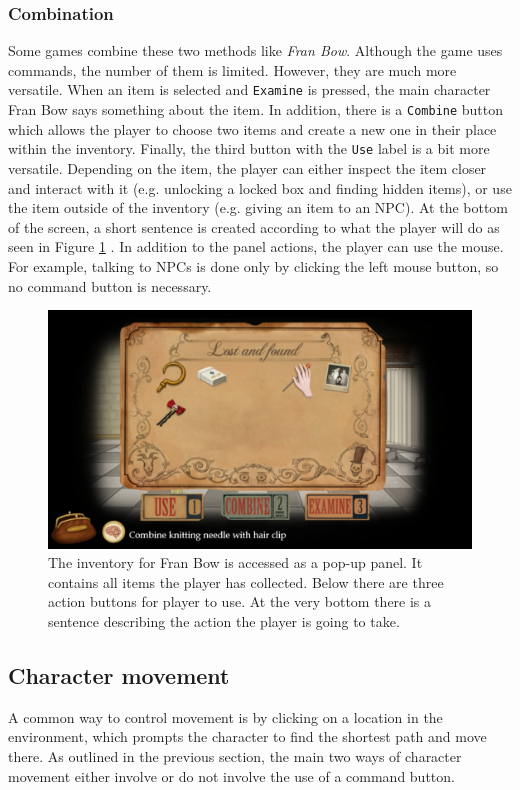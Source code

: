 \subsubsection{Combination}
Some games combine these two methods like \textit{Fran Bow}. Although the game uses commands, the number of them is limited. However, they are much more versatile. When an item is selected and \texttt{Examine} is pressed, the main character Fran Bow says something about the item. In addition, there is a \texttt{Combine} button which allows the player to choose two items and create a new one in their place within the inventory. Finally, the third button with the \texttt{Use} label is a bit more versatile. Depending on the item, the player can either inspect the item closer and interact with it (e.g. unlocking a locked box and finding hidden items), or use the item outside of the inventory (e.g. giving an item to an NPC). At the bottom of the screen, a short sentence is created according to what the player will do as seen in Figure \ref{fig:C-FranBow} . 
In addition to the panel actions, the player can use the mouse. For example, talking to NPCs is done only by clicking the left mouse button, so no command button is necessary. 
\begin{figure}[H]
\centering
\includegraphics[width=1.\linewidth]{img/Fran_Bow.png}
\caption{The inventory for Fran Bow is accessed as a pop-up panel. It contains all items the player has collected. Below there are three action buttons for player to use. At the very bottom there is a sentence describing the action the player is going to take.}
\label{fig:C-FranBow}
\end{figure}

\subsection{Character movement}
A common way to control movement is by clicking on a location in the environment, which prompts the character to find the shortest path and move there. As outlined in the previous section, the main two ways of character movement either involve or do not involve the use of a command button.

